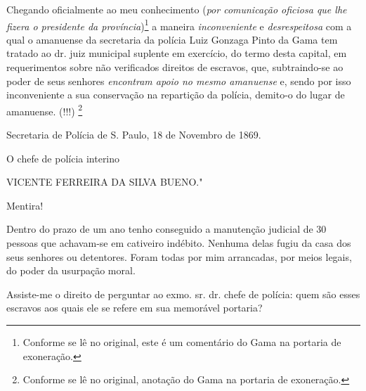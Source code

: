 Chegando oficialmente ao meu conhecimento (\emph{por comunicação
oficiosa que lhe fizera o presidente da província})\footnote{Conforme
  se lê no original, este é um comentário do Gama na portaria de
  exoneração.} a maneira \emph{inconveniente} e \emph{desrespeitosa} com
a qual o amanuense da secretaria da polícia Luiz Gonzaga Pinto da Gama
tem tratado ao dr. juiz municipal suplente em exercício, do termo desta
capital, em requerimentos sobre não verificados direitos de escravos,
que, subtraindo-se ao poder de seus senhores \emph{encontram apoio no
mesmo amanuense} e, sendo por isso inconveniente a sua conservação na
repartição da polícia, demito-o do lugar de amanuense. (!!!) \footnote{
  Conforme se lê no original, anotação do Gama na portaria de
  exoneração.}

Secretaria de Polícia de S. Paulo, 18 de Novembro de 1869.

O chefe de polícia interino

VICENTE FERREIRA DA SILVA BUENO."

Mentira!

Dentro do prazo de um ano tenho conseguido a manutenção judicial de 30
pessoas que achavam-se em cativeiro indébito. Nenhuma delas fugiu da
casa dos seus senhores ou detentores. Foram todas por mim arrancadas,
por meios legais, do poder da usurpação moral.

Assiste-me o direito de perguntar ao exmo. sr. dr. chefe de polícia:
quem são esses escravos aos quais ele se refere em sua memorável
portaria?

